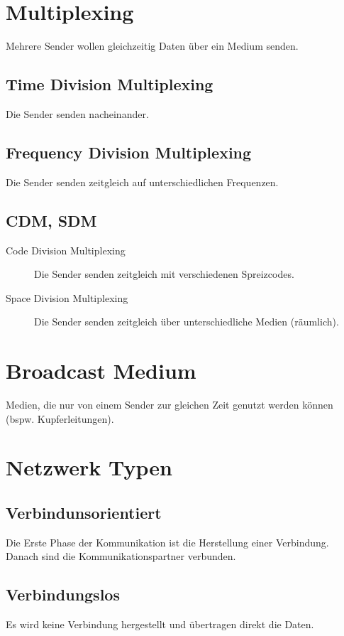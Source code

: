     \section{Multiplexing}
        Mehrere Sender wollen gleichzeitig Daten über ein Medium senden.

        \subsection{Time Division Multiplexing}
            Die Sender senden nacheinander.

        \subsection{Frequency Division Multiplexing}
            Die Sender senden zeitgleich auf unterschiedlichen Frequenzen.

        \subsection{CDM, SDM}
            \begin{description}
            	\item[Code Division Multiplexing] Die Sender senden zeitgleich mit verschiedenen Spreizcodes.
            	\item[Space Division Multiplexing] Die Sender senden zeitgleich über unterschiedliche Medien (räumlich).
            \end{description}

    \section{Broadcast Medium}
        Medien, die nur von einem Sender zur gleichen Zeit genutzt werden können (bspw. Kupferleitungen).

    \section{Netzwerk Typen}
        \subsection{Verbindunsorientiert}
            Die Erste Phase der Kommunikation ist die Herstellung einer Verbindung. Danach sind die Kommunikationspartner verbunden.

        \subsection{Verbindungslos}
            Es wird keine Verbindung hergestellt und übertragen direkt die Daten.

